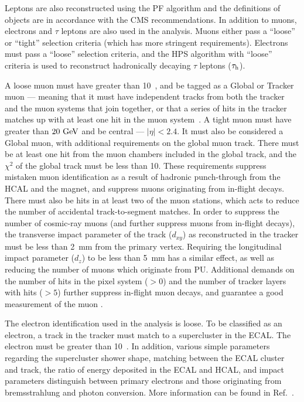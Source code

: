 Leptons are also reconstructed using the \ac{PF} algorithm and the definitions of objects are in accordance with the \ac{CMS} recommendations.
In addition to muons, electrons and $\tau$ leptons are also used in the analysis.
Muons either pass a ``loose'' or ``tight'' selection criteria (which has more stringent requirements). 
Electrons must pass a ``loose'' selection criteria, and the \ac{HPS} algorithm with ``loose'' criteria is used to reconstruct hadronically decaying $\tau$ leptons ($\tau_\mathrm{h}$).

A loose muon must have \pt{} greater than 10~\GeV{}, and be tagged as a Global or Tracker muon --- meaning that it must
have independent tracks from both the tracker and the muon systems that join together, or that a series of hits in the tracker matches up with at least one hit in the muon system~\cite{CMS-PAPER-MUO-10-004}. 
%
A tight muon must have \pt\,greater than $20~\mathrm{GeV}$ and be central --- $|\eta|<2.4$. 
It must also be considered a Global muon, with additional requirements on the global muon track. 
There must be at least one hit from the muon chambers included in the global track, and the $\chi^{2}$ of the global track must be less than 10. These requirements suppress mistaken muon identification as a result of hadronic punch-through from the \ac{HCAL} and the magnet, and suppress muons originating from in-flight decays.
There must also be hits in at least two of the muon stations, which acts to reduce the number of accidental track-to-segment matches.
In order to suppress the number of cosmic-ray muons (and further suppress muons from in-flight decays), the transverse impact parameter of the track ($d_{xy}$) as reconstructed in the tracker must be less than 2~mm from the primary vertex. 
Requiring the longitudinal impact parameter ($d_{z}$) to be less than 5~mm has a similar effect, as well as reducing the number of muons which originate from \ac{PU}.
Additional demands on the number of hits in the pixel system ($>0$) and the number of tracker layers with hits ($>5$) further suppress in-flight muon decays, and guarantee a good measurement of the muon \pt{}.

The electron identification used in the analysis is loose. To be classified as an electron, a track in the tracker must match to a supercluster in the \ac{ECAL}. 
The electron \pt must be greater than 10~\GeV{}. 
In addition, various simple parameters regarding the supercluster shower shape, matching between the \ac{ECAL} cluster and track, 
the ratio of energy deposited in the \ac{ECAL} and \ac{HCAL}, and impact parameters distinguish between primary electrons and those originating from bremsstrahlung and photon conversion. More information can be found in Ref.~\cite{CMS:elecReco}.

